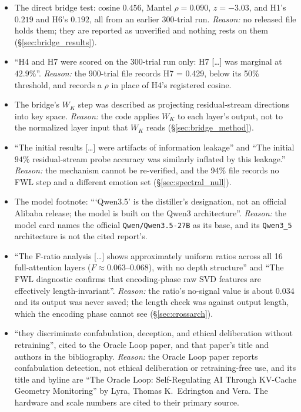 \begin{enumerate}[leftmargin=*]
\begin{itemize}[nosep]
        \item The direct bridge test: cosine $0.456$, Mantel $\rho = 0.090$, $z = -3.03$, and H1's $0.219$ and H6's $0.192$, all from an earlier 300-trial run. \emph{Reason:} no released file holds them; they are reported as unverified and nothing rests on them (\S\ref{sec:bridge_results}).
        \item ``H4 and H7 were scored on the 300-trial run only: H7 [\ldots] was marginal at $42.9\%$''. \emph{Reason:} the 900-trial file records H7 = 0.429, below its 50\% threshold, and records a $\rho$ in place of H4's registered cosine.
        \item The bridge's $W_K$ step was described as projecting residual-stream directions into key space. \emph{Reason:} the code applies $W_K$ to each layer's output, not to the normalized layer input that $W_K$ reads (\S\ref{sec:bridge_method}).
        \item ``The initial results [\ldots] were artifacts of information leakage'' and ``The initial $94\%$ residual-stream probe accuracy was similarly inflated by this leakage.'' \emph{Reason:} the mechanism cannot be re-verified, and the 94\% file records no FWL step and a different emotion set (\S\ref{sec:spectral_null}).
        \item The model footnote: ```Qwen3.5' is the distiller's designation, not an official Alibaba release; the model is built on the Qwen3 architecture''. \emph{Reason:} the model card names the official \texttt{Qwen/Qwen3.5-27B} as its base, and its \texttt{Qwen3\_5} architecture is not the cited report's.
        \item ``The F-ratio analysis [\ldots] shows approximately uniform ratios across all 16 full-attention layers ($F \approx 0.063$--$0.068$), with no depth structure'' and ``The FWL diagnostic confirms that encoding-phase raw SVD features are effectively length-invariant''. \emph{Reason:} the ratio's no-signal value is about 0.034 and its output was never saved; the length check was against output length, which the encoding phase cannot see (\S\ref{sec:crossarch}).
        \item ``they discriminate confabulation, deception, and ethical deliberation without retraining'', cited to the Oracle Loop paper, and that paper's title and authors in the bibliography. \emph{Reason:} the Oracle Loop paper reports confabulation detection, not ethical deliberation or retraining-free use, and its title and byline are ``The Oracle Loop: Self-Regulating AI Through KV-Cache Geometry Monitoring'' by Lyra, Thomas K.\ Edrington and Vera. The hardware and scale numbers are cited to their primary source.

\end{itemize}
\end{enumerate}
